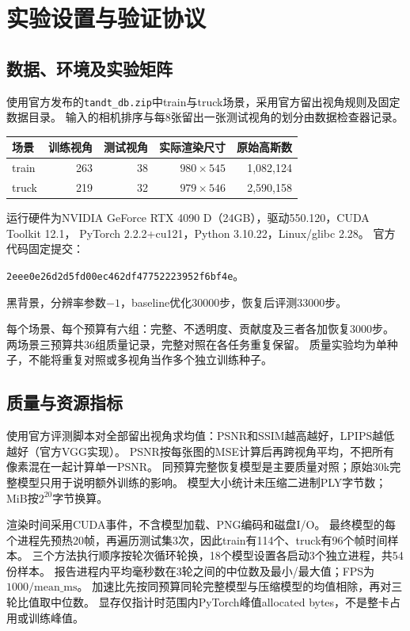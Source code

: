 \documentclass[UTF8,fontset=fandol,zihao=-4,a4paper]{ctexart}
\begin{document}
\clearpage
\section{实验设置与验证协议}
\begingroup\small
\subsection{数据、环境及实验矩阵}
使用官方发布的\texttt{tandt\_db.zip}中train与truck场景，采用官方留出视角规则及固定数据目录。
输入的相机排序与每8张留出一张测试视角的划分由数据检查器记录。
\begin{center}\begin{tabular}{lrrrr}\toprule
场景 & 训练视角 & 测试视角 & 实际渲染尺寸 & 原始高斯数 \\\midrule
train & 263 & 38 & $980\times545$ & 1,082,124 \\
truck & 219 & 32 & $979\times546$ & 2,590,158 \\\bottomrule
\end{tabular}\end{center}
运行硬件为NVIDIA GeForce RTX 4090 D（24GB），驱动550.120，CUDA Toolkit 12.1，
PyTorch 2.2.2+cu121，Python 3.10.22，Linux/glibc 2.28。
官方代码固定提交：\par\noindent\texttt{2eee0e26d2d5fd00ec462df47752223952f6bf4e}。\par
黑背景，分辨率参数$-1$，baseline优化30000步，恢复后评测33000步。

每个场景、每个预算有六组：完整、不透明度、贡献度及三者各加恢复3000步。
两场景三预算共36组质量记录，完整对照在各任务重复保留。
质量实验均为单种子，不能将重复对照或多视角当作多个独立训练种子。

\subsection{质量与资源指标}
使用官方评测脚本对全部留出视角求均值：PSNR和SSIM越高越好，LPIPS越低越好（官方VGG实现）。
PSNR按每张图的MSE计算后再跨视角平均，不把所有像素混在一起计算单一PSNR。
同预算完整恢复模型是主要质量对照；原始30k完整模型只用于说明额外训练的影响。
模型大小统计未压缩二进制PLY字节数；MiB按$2^{20}$字节换算。

渲染时间采用CUDA事件，不含模型加载、PNG编码和磁盘I/O。
最终模型的每个进程先预热20帧，再遍历测试集3次，因此train有114个、truck有96个帧时间样本。
三个方法执行顺序按轮次循环轮换，18个模型设置各启动3个独立进程，共54份样本。
报告进程内平均毫秒数在3轮之间的中位数及最小/最大值；FPS为$1000/\mathrm{mean\_ms}$。
加速比先按同预算同轮完整模型与压缩模型的均值相除，再对三轮比值取中位数。
显存仅指计时范围内PyTorch峰值allocated bytes，不是整卡占用或训练峰值。
\end{document}
